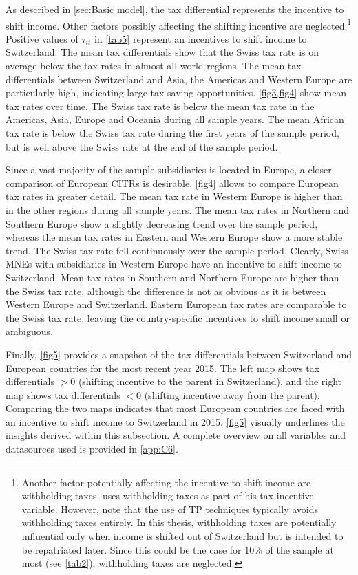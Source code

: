 \documentclass[10pt,twocolumn,oneside,cmyk]{article}
\begin{document}
As described in \cref{sec:Basic model}, the tax differential represents the incentive to shift income. Other factors possibly affecting the shifting incentive are neglected.\footnote{Another factor potentially affecting the incentive to shift income are withholding taxes. \textcite[15]{markle_comparison_2016} uses withholding taxes as part of his tax incentive variable. However, \textcite[289]{scholes_taxes_1992} note that the use of TP techniques typically avoids withholding taxes entirely. In this thesis, withholding taxes are potentially influential only when income is shifted out of Switzerland but is intended to be repatriated later. Since this could be the case for 10\% of the sample at most (see \cref{tab2}), withholding taxes are neglected.} Positive values of $\tau_{it}$ in \cref{tab5} represent an incentives to shift income to Switzerland. The mean tax differentials show that the Swiss tax rate is on average below the tax rates in almost all world regions. The mean tax differentials between Switzerland and Asia, the Americas and Western Europe are particularly high, indicating large tax saving opportunities. \cref{fig3,fig4} show mean tax rates over time. The Swiss tax rate is below the mean tax rate in the Americas, Asia, Europe and Oceania during all sample years. The mean African tax rate is below the Swiss tax rate during the first years of the sample period, but is well above the Swiss rate at the end of the sample period.

Since a vast majority of the sample subsidiaries is located in Europe, a closer comparison of European CITRs is desirable. \cref{fig4} allows to compare European tax rates in greater detail. The mean tax rate in Western Europe is higher than in the other regions during all sample years. The mean tax rates in Northern and Southern Europe show a slightly decreasing trend over the sample period, whereas the mean tax rates in Eastern and Western Europe show a more stable trend. The Swiss tax rate fell continuously over the sample period. Clearly, Swiss MNEs with subsidiaries in Western Europe have an incentive to shift income to Switzerland. Mean tax rates in Southern and Northern Europe are higher than the Swiss tax rate, although the difference is not as obvious as it is between Western Europe and Switzerland. Eastern European tax rates are comparable to the Swiss tax rate, leaving the country-specific incentives to shift income small or ambiguous.

Finally, \cref{fig5} provides a snapshot of the tax differentials between Switzerland and European countries for the most recent year 2015. The left map shows tax differentials $> 0$ (shifting incentive to the parent in Switzerland), and the right map shows tax differentials $< 0$ (shifting incentive away from the parent). Comparing the two maps indicates that most European countries are faced with an incentive to shift income to Switzerland in 2015. \cref{fig5} visually underlines the insights derived within this subsection. A complete overview on all variables and datasources used is provided in \cref{app:C6}.
\end{document}
